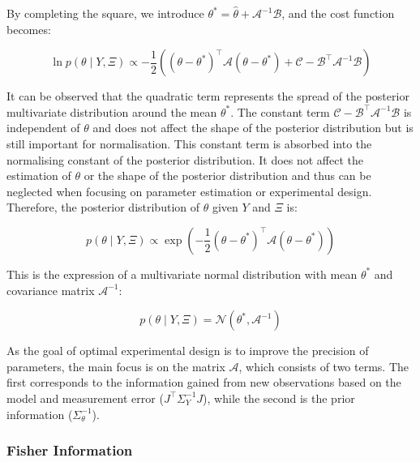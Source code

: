 \documentclass[a4paper,fleqn]{cas-dc}
\begin{document}
		By completing the square, we introduce $\theta^* = \hat{\theta} + \mathcal{A}^{-1} \mathcal{B}$, and the cost function becomes:
		
		{\footnotesize 
			\begin{equation} 
				\ln p\left(\theta \mid Y, \Xi \right) \propto -\frac{1}{2} \left( \left( \theta - \theta^* \right)^\top \mathcal{A} \left( \theta - \theta^* \right) + \mathcal{C} - \mathcal{B}^\top \mathcal{A}^{-1} \mathcal{B} \right) 
		\end{equation} }
		
		It can be observed that the quadratic term represents the spread of the posterior multivariate distribution around the mean $\theta^*$. The constant term $\mathcal{C} - \mathcal{B}^\top \mathcal{A}^{-1} \mathcal{B}$ is independent of $\theta$ and does not affect the shape of the posterior distribution but is still important for normalisation. This constant term is absorbed into the normalising constant of the posterior distribution. It does not affect the estimation of $\theta$ or the shape of the posterior distribution and thus can be neglected when focusing on parameter estimation or experimental design. Therefore, the posterior distribution of $\theta$ given $Y$ and $\Xi$ is:
		
		{\footnotesize \begin{equation} p\left(\theta \mid Y, \Xi \right) \propto \exp \left( -\frac{1}{2} \left( \theta - \theta^* \right)^\top \mathcal{A} \left( \theta - \theta^* \right) \right) \end{equation} }
		
		This is the expression of a multivariate normal distribution with mean $\theta^*$ and covariance matrix $\mathcal{A}^{-1}$:
		
		{\footnotesize \begin{equation} p\left(\theta \mid Y, \Xi \right) = \mathcal{N}\left( \theta^*, \mathcal{A}^{-1} \right) \end{equation} }
		
		As the goal of optimal experimental design is to improve the precision of parameters, the main focus is on the matrix $\mathcal{A}$, which consists of two terms. The first corresponds to the information gained from new observations based on the model and measurement error ($J^\top \Sigma_Y^{-1} J$), while the second is the prior information ($\Sigma_\theta^{-1}$).
		
		\subsubsection{Fisher Information}
		
\end{document}
